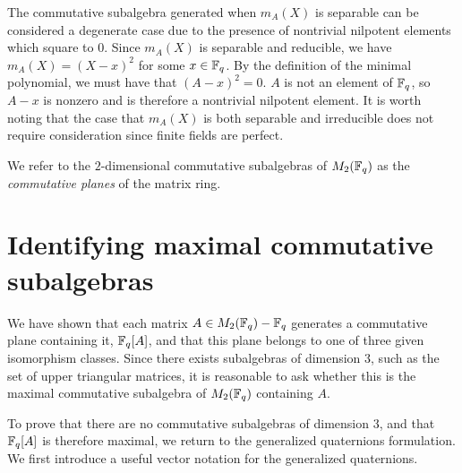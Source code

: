 \documentclass{amsart}
\begin{document}
    The commutative subalgebra generated when $m_A(X)$ is separable can be considered a degenerate case due to the presence of nontrivial nilpotent elements which square to $0$. Since $m_A(X)$ is separable and reducible, we have $m_A(X) = (X - x)^2$ for some $x \in \protect\mathbb{F}_q$. By the definition of the minimal polynomial, we must have that $(A - x) ^ 2 = 0$. $A$ is not an element of $\protect\mathbb{F}_q$, so $A - x$ is nonzero and is therefore a nontrivial nilpotent element.
    It is worth noting that the case that $m_A(X)$ is both separable and irreducible does not require consideration since finite fields are perfect.

    \begin{defn}
        We refer to the $2$-dimensional commutative subalgebras of $M_2(\protect\mathbb{F}_q)$ as the \textit{commutative planes} of the matrix ring.
    \end{defn}
    

\section{Identifying maximal commutative subalgebras}

We have shown that each matrix $A \in M_2(\protect\mathbb{F}_q) - \protect\mathbb{F}_q$ generates a commutative plane containing it, $\protect\mathbb{F}_q[A]$, and that this plane belongs to one of three given isomorphism classes.
Since there exists subalgebras of dimension 3, such as the set of upper triangular matrices, it is reasonable to ask whether this is the maximal commutative subalgebra of $M_2(\protect\mathbb{F}_q)$ containing $A$.

To prove that there are no commutative subalgebras of dimension 3, and that $\protect\mathbb{F}_q[A]$ is therefore maximal, we return to the generalized quaternions formulation. We first introduce a useful vector notation for the generalized quaternions.
\end{document}
